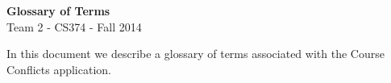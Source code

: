\documentclass[11pt]{article}
\begin{document}
\begin{center}
\LARGE \textbf{Glossary of Terms} \\
\normalsize Team 2 - CS374 - Fall 2014
\end{center}
\vspace{.1in}

In this document we describe a glossary of terms associated with the Course Conflicts application.


\end{document}
